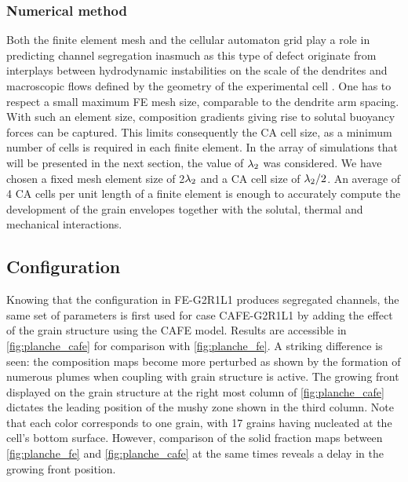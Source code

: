 \subsubsection{Numerical method}
Both the finite element mesh and the cellular automaton grid play a role in predicting channel segregation inasmuch as 
this type of defect originate from interplays between hydrodynamic instabilities on the scale of the dendrites 
and macroscopic flows defined by the geometry of the experimental cell \citep{shevchenko_chimney_2013}. One has to 
respect a small maximum FE mesh size, comparable to the dendrite arm spacing. With such an element size, composition gradients giving 
rise to solutal buoyancy forces can be captured. This limits consequently the CA cell size, as a minimum number 
of cells is required in each finite element. In the array of simulations that will be presented in the next section, 
the value of ${\lambda}_{2}$ was considered. We have chosen a fixed mesh element size of 2${\lambda}_{2}$ and a CA cell size of ${\lambda}_{2}/2$. 
An average of 4 CA cells per unit length of a finite element is enough to accurately compute the development of the 
grain envelopes together with the solutal, thermal and mechanical interactions.

\subsection{Configuration}

Knowing that the configuration in FE-G2R1L1 produces segregated channels, the same set of parameters is first used 
for case CAFE-G2R1L1 by adding the effect of the grain structure using the CAFE model. Results are accessible 
in \cref{fig:planche_cafe} for comparison with \cref{fig:planche_fe}. A striking difference is seen: the composition maps become more 
perturbed as shown by the formation of numerous plumes when coupling with grain structure is active. The growing 
front displayed on the grain structure at the right most column of \cref{fig:planche_cafe} dictates the leading position of the 
mushy zone shown in the third column. Note that each color corresponds to one grain, with 17 grains having nucleated 
at the cell’s bottom surface. However, comparison of the solid fraction maps between \cref{fig:planche_fe} and \cref{fig:planche_cafe} at the 
same times reveals a delay in the growing front position. 

